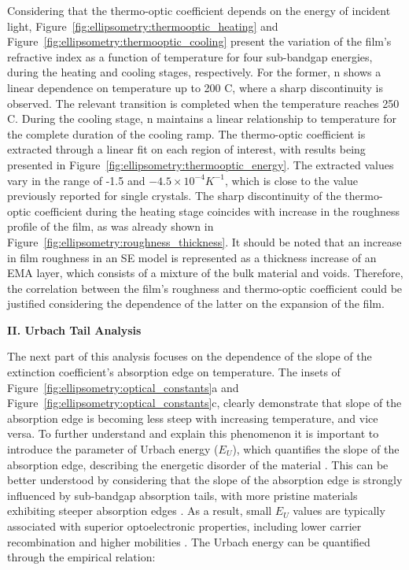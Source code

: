 Considering that the thermo-optic coefficient depends on the energy of incident light, Figure~\ref{fig:ellipsometry:thermooptic_heating} and Figure~\ref{fig:ellipsometry:thermooptic_cooling} present the variation of the film's refractive index as a function of temperature for four sub-bandgap energies, during the heating and cooling stages, respectively. For the former, n shows a linear dependence on temperature up to 200 \degree C, where a sharp discontinuity is observed. The relevant transition is completed when the temperature reaches 250 \degree C. During the cooling stage, n maintains a linear relationship to temperature for the complete duration of the cooling ramp. The thermo-optic coefficient is extracted through a linear fit on each region of interest, with results being presented in Figure~\ref{fig:ellipsometry:thermooptic_energy}. The extracted values vary in the range of -1.5 and $-4.5\times 10^{-4} K^{-1}$, which is close to the value previously reported for  single crystals. The sharp discontinuity of the thermo-optic coefficient during the heating stage coincides with increase in the roughness profile of the film, as was already shown in Figure~\ref{fig:ellipsometry:roughness_thickness}. It should be noted that an increase in film roughness in an SE model is represented as a thickness increase of an EMA layer, which consists of a mixture of the bulk material and voids. Therefore, the correlation between the film's roughness and thermo-optic coefficient could be justified considering the dependence of the latter on the expansion of the film.


\textbf{II. Urbach Tail Analysis}

The next part of this analysis focuses on the dependence of the slope of the extinction coefficient's absorption edge on temperature. The insets of Figure~\ref{fig:ellipsometry:optical_constants}a and Figure~\ref{fig:ellipsometry:optical_constants}c, clearly demonstrate that slope of the absorption edge is becoming less steep with increasing temperature, and vice versa. To further understand and explain this phenomenon it is important to introduce the parameter of Urbach energy ($E_U$), which quantifies the slope of the absorption edge, describing the energetic disorder of the material \cite{Urbach1953TheSolids,Rajagopal2017DefectPhotovoltaics}. This can be better understood by considering that the slope of the absorption edge is strongly influenced by sub-bandgap absorption tails, with more pristine materials exhibiting steeper absorption edges \cite{Zhang2022UnravelingDisorder}. As a result, small $E_U$ values are typically associated with superior optoelectronic properties, including lower carrier recombination and higher mobilities \cite{Zhang2022UnravelingDisorder, Ledinsky2019TemperaturePerovskites}. The Urbach energy can be quantified through the empirical relation: 

